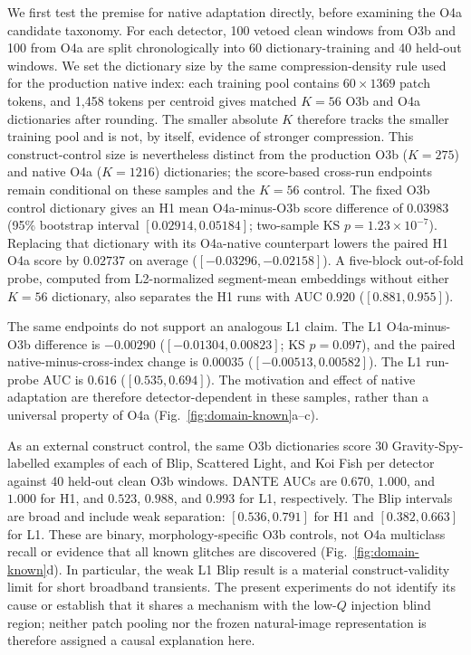 \documentclass[12pt]{article}
\begin{document}
We first test the premise for native adaptation directly, before examining the
O4a candidate taxonomy.  For each detector, 100 vetoed clean windows from O3b
and 100 from O4a are split chronologically into 60 dictionary-training and 40
held-out windows.  We set the dictionary size by the same compression-density
rule used for the production native index: each training pool contains
$60\times1369$ patch tokens, and 1,458 tokens per centroid gives matched $K=56$
O3b and O4a dictionaries after rounding.  The smaller absolute $K$ therefore
tracks the smaller training pool and is not, by itself, evidence of stronger
compression.  This construct-control size is nevertheless distinct from the
production O3b ($K=275$) and native O4a ($K=1216$) dictionaries; the
score-based cross-run endpoints remain conditional on these samples and the
$K=56$ control.  The fixed O3b control dictionary gives an H1 mean
O4a-minus-O3b score
difference of $0.03983$ (95\% bootstrap interval
$[0.02914,0.05184]$; two-sample KS $p=1.23\times10^{-7}$).  Replacing that
dictionary with its O4a-native counterpart lowers the paired H1 O4a score by
$0.02737$ on average ($[-0.03296,-0.02158]$).  A five-block out-of-fold probe,
computed from L2-normalized segment-mean embeddings without either $K=56$
dictionary, also separates the H1 runs with AUC $0.920$ ($[0.881,0.955]$).

The same endpoints do not support an analogous L1 claim.  The L1 O4a-minus-O3b
difference is $-0.00290$ ($[-0.01304,0.00823]$; KS $p=0.097$), and the paired
native-minus-cross-index change is $0.00035$ ($[-0.00513,0.00582]$).  The L1
run-probe AUC is $0.616$ ($[0.535,0.694]$).  The motivation and effect of
native adaptation are therefore detector-dependent in these samples, rather
than a universal property of O4a (Fig.~\ref{fig:domain-known}a--c).

As an external construct control, the same O3b dictionaries score 30
Gravity-Spy-labelled examples \cite{gspy_zenodo} of each of Blip, Scattered Light, and Koi Fish
per detector against 40 held-out clean O3b windows.  DANTE AUCs are
$0.670$, $1.000$, and $1.000$ for H1, and $0.523$, $0.988$, and $0.993$ for
L1, respectively.  The Blip intervals are broad and include weak separation:
$[0.536,0.791]$ for H1 and $[0.382,0.663]$ for L1.  These are binary,
morphology-specific O3b controls, not O4a multiclass recall or evidence that
all known glitches are discovered (Fig.~\ref{fig:domain-known}d).  In
particular, the weak L1 Blip result is a material construct-validity limit for
short broadband transients.  The present experiments do not identify its
cause or establish that it shares a mechanism with the low-$Q$ injection blind
region; neither patch pooling nor the frozen natural-image representation is
therefore assigned a causal explanation here.
\end{document}
